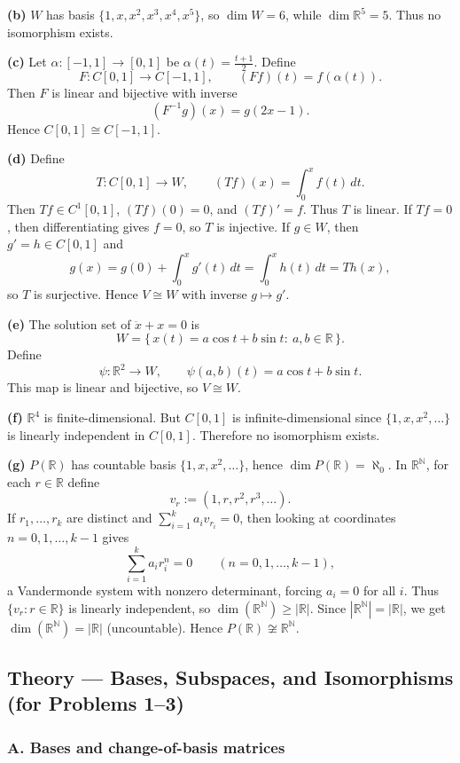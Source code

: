 \documentclass[12pt,a4paper]{article}
\theoremstyle{plain}
\theoremstyle{definition}      %
\begin{document}
\medskip
\noindent\textbf{(b)} $W$ has basis $\{1,x,x^2,x^3,x^4,x^5\}$, so $\dim W=6$, while $\dim\mathbb R^5=5$.
Thus no isomorphism exists.

\medskip
\noindent\textbf{(c)} Let $\alpha:[-1,1]\to[0,1]$ be $\alpha(t)=\frac{t+1}{2}$.
Define
\[
F:C[0,1]\to C[-1,1],\qquad (Ff)(t)=f(\alpha(t)).
\]
Then $F$ is linear and bijective with inverse
\[
(F^{-1}g)(x)=g(2x-1).
\]
Hence $C[0,1]\cong C[-1,1]$.

\medskip
\noindent\textbf{(d)} Define
\[
T:C[0,1]\to W,\qquad (Tf)(x)=\int_0^x f(t)\,dt.
\]
Then $Tf\in C^1[0,1]$, $(Tf)(0)=0$, and $(Tf)'=f$. Thus $T$ is linear.
If $Tf=0$, then differentiating gives $f=0$, so $T$ is injective. If $g\in W$, then $g'=h\in C[0,1]$ and
\[
g(x)=g(0)+\int_0^x g'(t)\,dt=\int_0^x h(t)\,dt = Th(x),
\]
so $T$ is surjective. Hence $V\cong W$ with inverse $g\mapsto g'$.

\medskip
\noindent\textbf{(e)} The solution set of $\ddot x + x=0$ is
\[
W=\{\,x(t)=a\cos t + b\sin t:\ a,b\in\mathbb R\,\}.
\]
Define
\[
\psi:\mathbb R^2\to W,\qquad \psi(a,b)(t)=a\cos t+b\sin t.
\]
This map is linear and bijective, so $V\cong W$.

\medskip
\noindent\textbf{(f)} $\mathbb R^4$ is finite-dimensional.
But $C[0,1]$ is infinite-dimensional since $\{1,x,x^2,\dots\}$ is linearly independent in $C[0,1]$.
Therefore no isomorphism exists.

\medskip
\noindent\textbf{(g)} $P(\mathbb R)$ has countable basis $\{1,x,x^2,\dots\}$, hence $\dim P(\mathbb R)=\aleph_0$.
In $\mathbb R^{\mathbb N}$, for each $r\in\mathbb R$ define
\[
v_r:=(1,r,r^2,r^3,\dots).
\]
If $r_1,\dots,r_k$ are distinct and $\sum_{i=1}^k a_i v_{r_i}=0$, then looking at coordinates $n=0,1,\dots,k-1$ gives
\[
\sum_{i=1}^k a_i r_i^n=0\qquad (n=0,1,\dots,k-1),
\]
a Vandermonde system with nonzero determinant, forcing $a_i=0$ for all $i$.
Thus $\{v_r:r\in\mathbb R\}$ is linearly independent, so $\dim(\mathbb R^{\mathbb N})\ge |\mathbb R|$.
Since $|\mathbb R^{\mathbb N}|=|\mathbb R|$, we get $\dim(\mathbb R^{\mathbb N})=|\mathbb R|$ (uncountable).
Hence $P(\mathbb R)\not\cong \mathbb R^{\mathbb N}$.

\subsection*{Theory — Bases, Subspaces, and Isomorphisms (for Problems 1--3)}

\subsubsection*{A. Bases and change-of-basis matrices}
\end{document}
